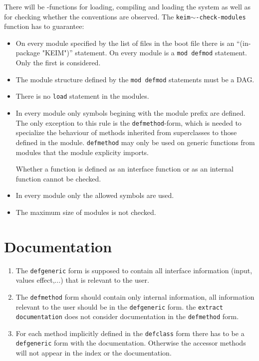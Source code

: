 There will be \keim-functions for loading, compiling and loading the
system as well as for checking whether the conventions are observed.
The {\tt keim$\sim$-check-modules} function has to guarantee:

\begin{itemize}
\item On every module specified by the list of files in the boot file
there is an ``(in-package "KEIM")'' statement. On every module is a
{\tt mod~defmod} statement. Only the first is considered.

\item The module structure defined by the {\tt mod~defmod} statements
must be a DAG.

\item There is no {\tt load} statement in the modules. 

\item In every module only symbols begining with the module prefix are
defined. The only exception to this rule is the {\tt defmethod}-form,
which is needed to specialize the behaviour of methods inherited from
superclasses to those defined in the module. {\tt defmethod} may only
be used on generic functions from modules that the module explicity
imports.  

Whether a function is defined as an interface function or
as an internal function cannot be checked.

\item In every module only the allowed symbols are used.

\item The maximum size of modules is not checked.

\end{itemize}


\section{Documentation}
\begin{enumerate}
\item The {\tt defgeneric} form is supposed to contain all interface
      information (input, values effect,...) that is relevant to the user.
\item The {\tt defmethod} form should contain only internal
      information, all information relevant to the user should be in the
      {\tt defgeneric} form. the {\tt extract documentation} does not
      consider documentation in the {\tt defmethod} form.
\item For each method implicitly defined in the {\tt defclass} form there has to be a {\tt defgeneric}
      form with the documentation. Otherwise the accessor methods will not appear in the index 
      or the documentation.
\end{enumerate}

